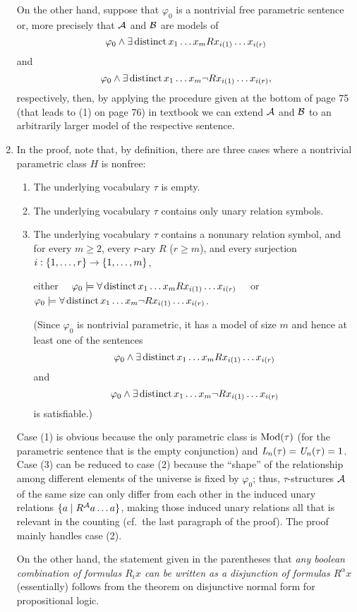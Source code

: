 \begin{enumerate}[1.]
On the other hand, suppose that $\varphi_0$ is a nontrivial free parametric sentence or, more precisely that $\mathcal{A}$ and $\mathcal{B}$ are models of
\[
\varphi_0 \land \exists \mathop{\mathrm{distinct}} x_1 \ldots x_m Rx_{i(1)} \ldots x_{i(r)}
\]
and
\[
\varphi_0 \land \exists \mathop{\mathrm{distinct}} x_1 \ldots x_m \neg Rx_{i(1)} \ldots x_{i(r)},
\]
respectively, then, by applying the procedure given at the bottom of page 75 (that leads to (1) on page 76) in textbook we can extend $\mathcal{A}$ and $\mathcal{B}$ to an arbitrarily larger model of the respective sentence.
%
\item {} In the proof, note that, by definition, there are three cases where a nontrivial parametric class $H$ is nonfree:
\begin{enumerate}[(1)]
\item The underlying vocabulary $\tau$ is empty.
\item The underlying vocabulary $\tau$ contains only unary relation symbols.
\item The underlying vocabulary $\tau$ contains a nonunary relation symbol, and for every $m \geq 2$, every $r$-ary $R$ ($r \geq m$), and every surjection $i : {\{1, \ldots, r\}} \to {\{1, \ldots, m\}}$,
\begin{center}
either \ \ $\varphi_0 \models \forall \mathop{\mathrm{distinct}} x_1 \ldots x_m Rx_{i(1)} \ldots x_{i(r)}$ \ \ or \ \ $\varphi_0 \models \forall \mathop{\mathrm{distinct}} x_1 \ldots x_m \neg Rx_{i(1)} \ldots x_{i(r)}$.
\end{center}
(Since $\varphi_0$ is nontrivial parametric, it has a model of size $m$ and hence at least one of the sentences
\[
\varphi_0 \land \exists \mathop{\mathrm{distinct}} x_1 \ldots x_m Rx_{i(1)} \ldots x_{i(r)}
\]
and
\[
\varphi_0 \land \exists \mathop{\mathrm{distinct}} x_1 \ldots x_m \neg Rx_{i(1)} \ldots x_{i(r)}
\]
is satisfiable.)
\end{enumerate}
Case (1) is obvious because the only parametric class is $\mathrm{Mod}(\tau)$ (for the parametric sentence that is the empty conjunction) and $\mathit{L}_{n}(\tau) = \mathit{U}_{n}(\tau) = 1$. Case (3) can be reduced to case (2) because the ``shape'' of the relationship among different elements of the universe is fixed by $\varphi_0$; thus, $\tau$-structures $\mathcal{A}$ of the same size can only differ from each other in the induced unary relations ${\{a \mid R^{\mathcal{A}} a \ldots a\}}$, making those induced unary relations all that is relevant in the counting (cf.\ the last paragraph of the proof). The proof mainly handles case (2).

On the other hand, the statement given in the parentheses that \emph{any boolean combination of formulas $R_i x$ can be written as a disjunction of formulas $R^\alpha x$} (essentially) follows from the theorem on disjunctive normal form for propositional logic.


\end{enumerate}

